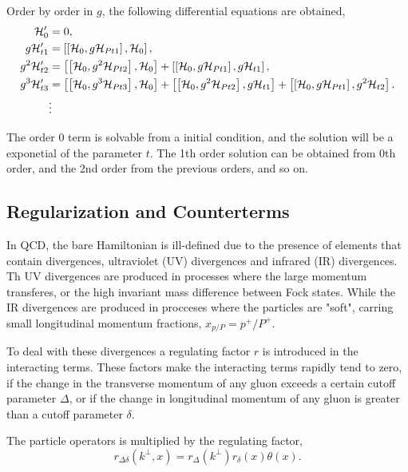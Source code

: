 \documentclass[11pt,a4paper,twoside,pdf]{article}
\numberwithin{equation}{section}
\begin{document}
Order by order in $g$, the following differential equations are obtained,
\begin{align}
        \mathcal{H}_{0}^\prime &= 0, \\
        g\mathcal{H}_{t 1}^\prime &= \left[ \left[ \mathcal{H}_0, g\mathcal{H}_{Pt 1} \right], 
        \mathcal{H}_{0} \right], \\
        g^2\mathcal{H}_{t 2}^\prime &= \left[ \left[ \mathcal{H}_0, g^2\mathcal{H}_{Pt 2} \right], 
        \mathcal{H}_{0} \right] + \left[ \left[ \mathcal{H}_0, g\mathcal{H}_{Pt 1} \right], 
        g\mathcal{H}_{t 1} \right], \\
        g^3\mathcal{H}_{t 3}^\prime &= \left[ \left[ \mathcal{H}_0, g^3\mathcal{H}_{Pt 3} \right], 
        \mathcal{H}_{0} \right] + \left[ \left[ \mathcal{H}_0, g^2\mathcal{H}_{Pt 2} \right], 
        g\mathcal{H}_{t 1} \right] + \left[ \left[ \mathcal{H}_0, g\mathcal{H}_{Pt 1} \right], 
        g^2\mathcal{H}_{t 2} \right].\\
        &\vdots \nonumber
\end{align}

The order 0 term is solvable from a initial condition, and the solution will be a 
exponetial of the parameter $t$. The 1th order solution can be obtained from 0th 
order, and the 2nd order from the previous orders, and so on. 

\subsection{Regularization and Counterterms}

In QCD, the bare Hamiltonian is ill-defined due to the presence of elements 
that contain divergences, ultraviolet (UV) divergences and infrared (IR) divergences.
Th UV divergences are produced in processes where the large momentum transferes, 
or the high invariant mass difference between Fock states. While the IR divergences
are produced in procceses where the particles are "soft", carring small longitudinal
momentum fractions, $x_{p/P} = p^+/P^+$.

To deal with these divergences a regulating factor $r$ is 
introduced in the interacting terms. These factors make the interacting terms rapidly 
tend to zero, if the change in the transverse momentum of any gluon exceeds a certain
cutoff parameter $\Delta$, or if the change in longitudinal momentum of any gluon is
greater than a cutoff parameter $\delta$. 

The particle operators is multiplied by the regulating factor, 
\begin{equation}
    r_{\Delta \delta} (k^\perp, x) = r_\Delta (k^\perp) r_\delta(x) \theta(x).
\end{equation}
\end{document}
